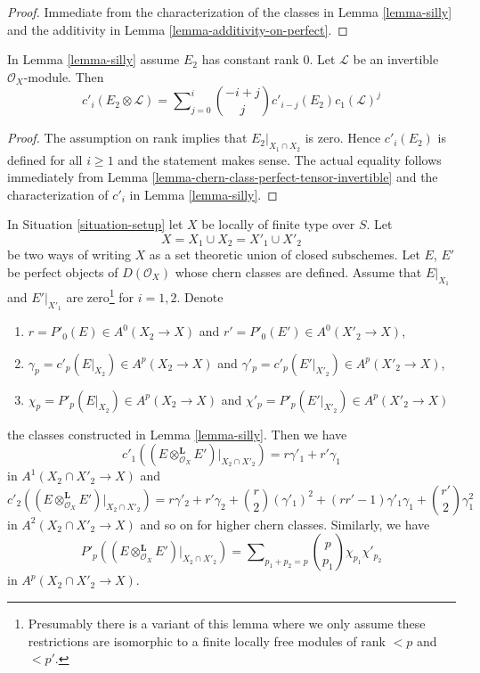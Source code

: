 \begin{proof}
Immediate from the characterization of the classes in
Lemma \ref{lemma-silly} and the additivity in
Lemma \ref{lemma-additivity-on-perfect}.
\end{proof}

\begin{lemma}
\label{lemma-silly-tensor-invertible}
In Lemma \ref{lemma-silly} assume $E_2$ has constant rank $0$.
Let $\mathcal{L}$ be an invertible $\mathcal{O}_X$-module. Then
$$
c'_i(E_2 \otimes \mathcal{L}) =
\sum\nolimits_{j = 0}^i
\binom{- i + j}{j} c'_{i - j}(E_2) c_1(\mathcal{L})^j
$$
\end{lemma}

\begin{proof}
The assumption on rank implies that $E_2|_{X_1 \cap X_2}$ is zero.
Hence $c'_i(E_2)$ is defined for all $i \geq 1$ and the statement
makes sense. The actual equality follows
immediately from Lemma \ref{lemma-chern-class-perfect-tensor-invertible}
and the characterization of $c'_i$ in Lemma \ref{lemma-silly}.
\end{proof}

\begin{lemma}
\label{lemma-silly-tensor-product}
In Situation \ref{situation-setup} let $X$ be locally of finite type over $S$.
Let
$$
X = X_1 \cup X_2 = X'_1 \cup X'_2
$$
be two ways of writing $X$ as a set theoretic union of closed subschemes.
Let $E$, $E'$ be perfect objects of $D(\mathcal{O}_X)$
whose chern classes are defined.
Assume that $E|_{X_1}$ and $E'|_{X'_1}$ are zero\footnote{Presumably there
is a variant of this lemma where we only assume these restrictions are
isomorphic to a finite locally free modules
of rank $< p$ and $< p'$.} for $i = 1, 2$. Denote
\begin{enumerate}
\item $r = P'_0(E) \in A^0(X_2 \to X)$ and
$r' = P'_0(E') \in A^0(X'_2 \to X)$,
\item $\gamma_p = c'_p(E|_{X_2}) \in A^p(X_2 \to X)$ and
$\gamma'_p = c'_p(E'|_{X'_2}) \in A^p(X'_2 \to X)$,
\item $\chi_p = P'_p(E|_{X_2}) \in A^p(X_2 \to X)$ and
$\chi'_p = P'_p(E'|_{X'_2}) \in A^p(X'_2 \to X)$
\end{enumerate}
the classes constructed in Lemma \ref{lemma-silly}. Then we have
$$
c'_1((E \otimes_{\mathcal{O}_X}^\mathbf{L} E')|_{X_2 \cap X'_2}) =
r \gamma'_1 + r' \gamma_1
$$
in $A^1(X_2 \cap X'_2 \to X)$ and
$$
c'_2((E \otimes_{\mathcal{O}_X}^\mathbf{L} E')|_{X_2 \cap X'_2}) =
r \gamma'_2 + r' \gamma_2 + {r \choose 2} (\gamma'_1)^2 +
(rr' - 1) \gamma'_1\gamma_1 + {r' \choose 2} \gamma_1^2
$$
in $A^2(X_2 \cap X'_2 \to X)$ and so on for higher chern classes.
Similarly, we have
$$
P'_p((E \otimes_{\mathcal{O}_X}^\mathbf{L} E')|_{X_2 \cap X'_2}) =
\sum\nolimits_{p_1 + p_2 = p}
{p \choose p_1} \chi_{p_1} \chi'_{p_2}
$$
in $A^p(X_2 \cap X'_2 \to X)$.
\end{lemma}

